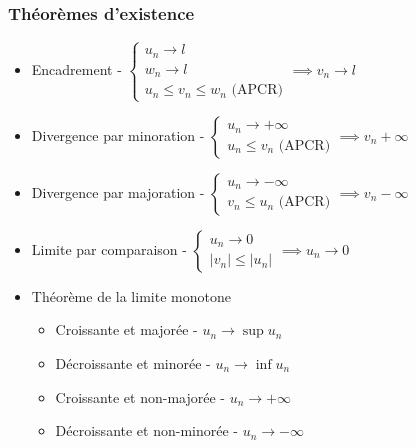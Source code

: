 \documentclass[openany]{book}
\begin{document}
\subsubsection{Théorèmes d'existence}
\begin{itemize}
    \item Encadrement - $ \begin{cases}
        u_n \longrightarrow l \\
        w_n \longrightarrow l \\
        u_n \leq v_n \leq w_n \text{ (APCR)}
    \end{cases} \implies v_n \longrightarrow l $
    \item Divergence par minoration - $ \begin{cases}
        u_n \longrightarrow +\infty \\
        u_n \leq v_n \text{ (APCR)}
    \end{cases} \implies v_n +\infty $
    \item Divergence par majoration - $ \begin{cases}
        u_n \longrightarrow -\infty \\
        v_n \leq u_n \text{ (APCR)}
    \end{cases} \implies v_n -\infty $
    \item Limite par comparaison - $ \begin{cases}
        u_n \longrightarrow 0 \\
        |v_n| \leq |u_n| 
    \end{cases} \implies u_n \longrightarrow 0 $
    \item Théorème de la limite monotone
    \begin{itemize}
        \item Croissante et majorée - $ u_n \longrightarrow \sup{u_n} $ 
        \item Décroissante et minorée - $ u_n \longrightarrow \inf{u_n} $ 
        \item Croissante et non-majorée - $ u_n \longrightarrow +\infty $ 
        \item Décroissante et non-minorée - $ u_n \longrightarrow -\infty $ 
    \end{itemize}
\end{itemize}
\end{document}
